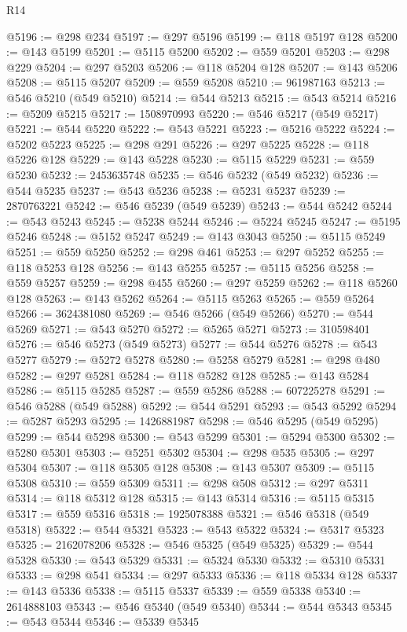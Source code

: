 \begin{lexlean}{R14}
\begin{coremodule}
@5196 := @298 @234
@5197 := @297 @5196
@5199 := @118 @5197 @128
@5200 := @143 @5199
@5201 := @5115 @5200
@5202 := @559 @5201
@5203 := @298 @229
@5204 := @297 @5203
@5206 := @118 @5204 @128
@5207 := @143 @5206
@5208 := @5115 @5207
@5209 := @559 @5208
@5210 := 961987163
@5213 := @546 @5210 (@549 @5210)
@5214 := @544 @5213
@5215 := @543 @5214
@5216 := @5209 @5215
@5217 := 1508970993
@5220 := @546 @5217 (@549 @5217)
@5221 := @544 @5220
@5222 := @543 @5221
@5223 := @5216 @5222
@5224 := @5202 @5223
@5225 := @298 @291
@5226 := @297 @5225
@5228 := @118 @5226 @128
@5229 := @143 @5228
@5230 := @5115 @5229
@5231 := @559 @5230
@5232 := 2453635748
@5235 := @546 @5232 (@549 @5232)
@5236 := @544 @5235
@5237 := @543 @5236
@5238 := @5231 @5237
@5239 := 2870763221
@5242 := @546 @5239 (@549 @5239)
@5243 := @544 @5242
@5244 := @543 @5243
@5245 := @5238 @5244
@5246 := @5224 @5245
@5247 := @5195 @5246
@5248 := @5152 @5247
@5249 := @143 @3043
@5250 := @5115 @5249
@5251 := @559 @5250
@5252 := @298 @461
@5253 := @297 @5252
@5255 := @118 @5253 @128
@5256 := @143 @5255
@5257 := @5115 @5256
@5258 := @559 @5257
@5259 := @298 @455
@5260 := @297 @5259
@5262 := @118 @5260 @128
@5263 := @143 @5262
@5264 := @5115 @5263
@5265 := @559 @5264
@5266 := 3624381080
@5269 := @546 @5266 (@549 @5266)
@5270 := @544 @5269
@5271 := @543 @5270
@5272 := @5265 @5271
@5273 := 310598401
@5276 := @546 @5273 (@549 @5273)
@5277 := @544 @5276
@5278 := @543 @5277
@5279 := @5272 @5278
@5280 := @5258 @5279
@5281 := @298 @480
@5282 := @297 @5281
@5284 := @118 @5282 @128
@5285 := @143 @5284
@5286 := @5115 @5285
@5287 := @559 @5286
@5288 := 607225278
@5291 := @546 @5288 (@549 @5288)
@5292 := @544 @5291
@5293 := @543 @5292
@5294 := @5287 @5293
@5295 := 1426881987
@5298 := @546 @5295 (@549 @5295)
@5299 := @544 @5298
@5300 := @543 @5299
@5301 := @5294 @5300
@5302 := @5280 @5301
@5303 := @5251 @5302
@5304 := @298 @535
@5305 := @297 @5304
@5307 := @118 @5305 @128
@5308 := @143 @5307
@5309 := @5115 @5308
@5310 := @559 @5309
@5311 := @298 @508
@5312 := @297 @5311
@5314 := @118 @5312 @128
@5315 := @143 @5314
@5316 := @5115 @5315
@5317 := @559 @5316
@5318 := 1925078388
@5321 := @546 @5318 (@549 @5318)
@5322 := @544 @5321
@5323 := @543 @5322
@5324 := @5317 @5323
@5325 := 2162078206
@5328 := @546 @5325 (@549 @5325)
@5329 := @544 @5328
@5330 := @543 @5329
@5331 := @5324 @5330
@5332 := @5310 @5331
@5333 := @298 @541
@5334 := @297 @5333
@5336 := @118 @5334 @128
@5337 := @143 @5336
@5338 := @5115 @5337
@5339 := @559 @5338
@5340 := 2614888103
@5343 := @546 @5340 (@549 @5340)
@5344 := @544 @5343
@5345 := @543 @5344
@5346 := @5339 @5345

\end{coremodule}
\end{lexlean}
